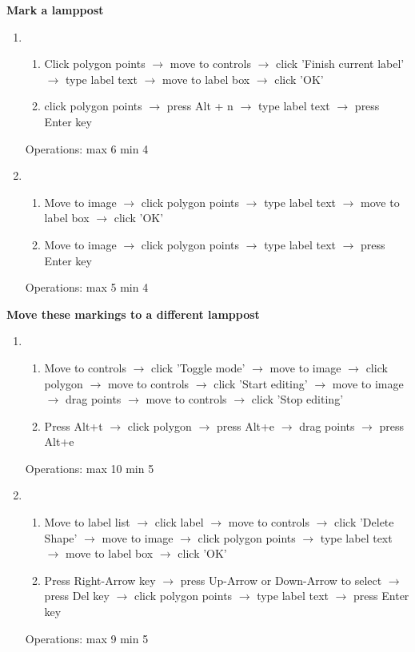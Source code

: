 \documentclass[a4paper,11pt,oneside]{article}
\begin{document}
{\bf Mark a lamppost}
\begin{enumerate}
    \item
    \begin{enumerate}
        \item Click polygon points $\rightarrow$ move to controls $\rightarrow$ click 'Finish current label' $\rightarrow$ type label text $\rightarrow$ move to label box $\rightarrow$ click 'OK'
        \item click polygon points $\rightarrow$ press Alt + n $\rightarrow$ type label text $\rightarrow$ press Enter key
    \end{enumerate}
    Operations: max 6 min 4
    \item
    \begin{enumerate}
        \item Move to image $\rightarrow$ click polygon points $\rightarrow$ type label text $\rightarrow$ move to label box $\rightarrow$ click 'OK'
        \item Move to image $\rightarrow$ click polygon points $\rightarrow$ type label text $\rightarrow$ press Enter key
    \end{enumerate}
    Operations: max 5 min 4
\end{enumerate}

{\bf Move these markings to a different lamppost}
\begin{enumerate}
    \item
    \begin{enumerate}
        \item Move to controls $\rightarrow$ click 'Toggle mode' $\rightarrow$ move to image $\rightarrow$ click polygon $\rightarrow$ move to controls $\rightarrow$ click 'Start editing' $\rightarrow$ move to image $\rightarrow$ drag points $\rightarrow$ move to controls $\rightarrow$ click 'Stop editing'
        \item Press Alt+t $\rightarrow$ click polygon $\rightarrow$ press Alt+e $\rightarrow$ drag points $\rightarrow$ press Alt+e
    \end{enumerate}
    Operations: max 10 min 5
    \item
    \begin{enumerate}
        \item Move to label list $\rightarrow$ click label $\rightarrow$ move to controls $\rightarrow$ click 'Delete Shape' $\rightarrow$ move to image $\rightarrow$ click polygon points $\rightarrow$ type label text $\rightarrow$ move to label box $\rightarrow$ click 'OK'
        \item Press Right-Arrow key $\rightarrow$ press Up-Arrow or Down-Arrow to select $\rightarrow$ press Del key $\rightarrow$ click polygon points $\rightarrow$ type label text $\rightarrow$ press Enter key
    \end{enumerate}
    Operations: max 9 min 5
\end{enumerate}
\end{document}
